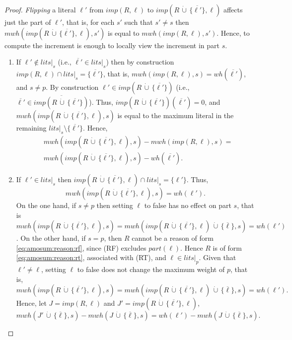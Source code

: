 \documentclass[preprint,authoryear]{elsarticle}
\newcommand{\lits}{\mathit{lits}}
\newcommand{\mwh}{\mathit{mwh}}
\newcommand{\wh}{\mathit{wh}}
\newcommand{\cupdot}{\,\dot{\cup}\,}
\theoremstyle{definition}
\begin{document}
{\color{blue}
\begin{proof}
   \emph{Flipping} a literal $\ell'$ from $\mathit{imp}(R,\ell)$ to $\mathit{imp}(R \cupdot \{ {\overline{\ell'}} \},\ell)$ affects just the part of $\ell'$,
    that is, for each $s'$ such that $s'\neq s$ then $\mwh(\mathit{imp}(R \cupdot \{ {\overline{\ell'}} \},\ell), s') $ is equal to $ \mwh(\mathit{imp}(R,\ell), s')$.
    Hence, to compute the increment is enough to locally view the increment in part $s$.
    \begin{enumerate}
        \item If $\ell' \not\in \lits|_s$ (i.e., $\overline{\ell'} \in \lits|_s$) then by construction $\mathit{imp}(R,\ell) \cap \lits|_s = \{\overline{\ell'}\}$, that is, $\mwh(\mathit{imp}(R,\ell), s) = \wh(\overline{\ell'})$, and $s \neq p$.
    By construction $\ell' \in \mathit{imp}(R\cupdot\{\overline{\ell'}\})$ (i.e., $\overline{\ell'} \in \overline{\mathit{imp}(R\cupdot\{\overline{\ell'}\})}$).
    Thus, $\mathit{imp}(R\cupdot\{\overline{\ell'}\})(\overline{\ell'}) = 0$, and $\mwh(\mathit{imp}(R \cupdot \{ {\overline{\ell'}} \},\ell),s)$ is equal to the maximum literal in the remaining $\lits|_s \setminus \{\overline{\ell'}\}$.
    Hence,
    \begin{align*}
        & \mwh(\mathit{imp}(R \cupdot \{ {\overline{\ell'}} \},\ell), s) - \mwh(\mathit{imp}(R,\ell), s) = \\
        & \mwh(\mathit{imp}(R \cupdot \{ {\overline{\ell'}} \},\ell), s) - \wh(\overline{\ell'}).
    \end{align*}
    \item If $\ell' \in \lits|_s$ then $\mathit{imp}(R \cupdot \{ {\overline{\ell'}} \},\ell) \cap \lits|_s = \{\ell'\}$.
    Thus, $$\mwh(\mathit{imp}(R \cupdot \{ {\overline{\ell'}} \},\ell),s) = \wh(\ell').$$
    On the one hand, if $s \neq p$ then setting $\ell$ to false has no effect on part $s$, that is $\mwh(\mathit{imp}(R \cupdot \{\overline{\ell'}\}, \ell), s) = \mwh(\mathit{imp}(R \cupdot \{\overline{\ell'}\}, \ell) \cupdot \{\overline{\ell}\}, s) = \wh(\ell')$.
    On the other hand, if $s=p$, then $R$ cannot be a reason of form \eqref{eq:amosum:reason:rf}, since (RF) excludes $part(\ell)$. Hence $R$ is of form \eqref{eq:amosum:reason:rt}, associated with (RT), and $\ell\in lits|_p$.
    Given that $\ell' \neq \ell$, setting $\ell$ to false does not change the maximum weight of $p$, that is, $$\mwh(\mathit{imp}(R \cupdot \{\overline{\ell'}\}, \ell), s) = \mwh(\mathit{imp}(R \cupdot \{\overline{\ell'}\}, \ell) \cupdot \{\overline{\ell}\}, s) = \wh(\ell').$$
    Hence, let $J = \mathit{imp}(R,\ell)$ and $J' = \mathit{imp}(R \cupdot \{ {\overline{\ell'}} \},\ell)$, $$\mwh(J' \cupdot \{\overline{\ell}\}, s) - \mwh(J \cupdot \{\overline{\ell}\}, s) = \wh(\ell') - \mwh( J \cupdot \{\overline{\ell}\}, s).$$
    \end{enumerate}
    
\end{proof}
}
\end{document}
